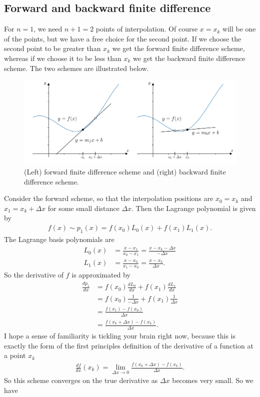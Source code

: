 \subsection{Forward and backward finite difference}
For $n=1$, we need $n+1=2$ points of interpolation. Of course $x=x_k$ will be one of the points, but we have a free choice for the second point. If we choose the second point to be greater than $x_k$ we get the forward finite difference scheme, whereas if we choose it to be less than $x_k$ we get the backward finite difference scheme. The two schemes are illustrated below.
\begin{figure}[H]
	\begin{center}
	\includegraphics[width=\textwidth]{figures/ch5_forward_backward_difference.pdf} 
	  \caption{(Left) forward finite difference scheme and (right) backward finite difference scheme.} \label{fig:ch5_forward_backward_difference}
	\end{center}
\end{figure}
Consider the forward scheme, so that the interpolation positions are $x_0=x_k$ and $x_1=x_k+\Delta x$ for some small distance $\Delta x$. Then the Lagrange polynomial is given by
\begin{align*}
f(x) \sim p_1(x) = f(x_0) L_0(x) + f(x_1) L_1(x).
\end{align*}
The Lagrange basis polynomials are
\begin{align*}
L_0(x) &= \frac{x-x_1}{x_0-x_1} = \frac{x-x_k-\Delta x}{-\Delta x} \\
L_1(x) &= \frac{x-x_0}{x_1-x_0} = \frac{x-x_k}{\Delta x}.
\end{align*}
So the derivative of $f$ is approximated by
\begin{align*}
\frac{d p_1}{dx} &= f(x_0) \frac{dL_0}{dx} + f(x_1) \frac{dL_1}{dx} \\
 &= f(x_0) \frac{1}{-\Delta x} + f(x_1)\frac{1}{\Delta x} \\
 &= \frac{f(x_1)- f(x_0)}{\Delta x} \\
 &= \frac{f(x_k + \Delta x)- f(x_k)}{\Delta x}.
\end{align*}
I hope a sense of familiarity is tickling your brain right now, because this is exactly the form of the first principles definition of the derivative of a function at a point $x_k$
\begin{align*}
\frac{df}{dx}(x_k) = \lim_{\Delta x \to 0} \frac{f(x_k + \Delta x)- f(x_k)}{\Delta x}.
\end{align*}
So this scheme converges on the true derivative as $\Delta x$ becomes very small. So we have 

